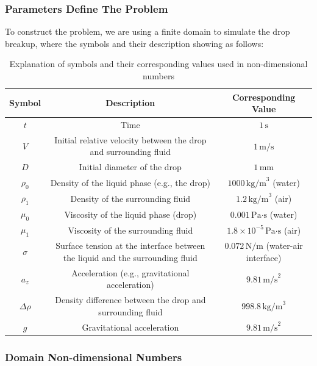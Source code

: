 \documentclass[12pt]{article}
\begin{document}
\subsubsection{Parameters Define The Problem}
To construct the problem, we are using a finite domain to simulate the drop breakup, where the symbols and their description showing as follows:
\begin{table}[H]
\scriptsize
\centering
\caption{Explanation of symbols and their corresponding values used in non-dimensional numbers}
\renewcommand{\arraystretch}{1.5} %
\begin{tabular}{|c|c|c|}
\hline
\textbf{Symbol} & \textbf{Description} & \textbf{Corresponding Value} \\ \hline
$t$     & Time & $1 \, \text{s}$ \\ \hline
$V$     & Initial relative velocity between the drop and surrounding fluid & $1 \, \text{m/s}$ \\ \hline
$D$     & Initial diameter of the drop & $1 \, \text{mm}$ \\ \hline
$\rho_0$ & Density of the liquid phase (e.g., the drop) & $1000 \, \text{kg/m}^3$ (water) \\ \hline
$\rho_1$ & Density of the surrounding fluid & $1.2 \, \text{kg/m}^3$ (air) \\ \hline
$\mu_0$  & Viscosity of the liquid phase (drop) & $0.001 \, \text{Pa·s}$ (water) \\ \hline
$\mu_1$  & Viscosity of the surrounding fluid & $1.8 \times 10^{-5} \, \text{Pa·s}$ (air) \\ \hline
$\sigma$ & Surface tension at the interface between the liquid and the surrounding fluid & $0.072 \, \text{N/m}$ (water-air interface) \\ \hline
$a_z$ & Acceleration (e.g., gravitational acceleration) & $9.81 \, \text{m/s}^2$ \\ \hline
$\Delta \rho$ & Density difference between the drop and surrounding fluid & $998.8 \, \text{kg/m}^3$ \\ \hline
$g$ & Gravitational acceleration & $9.81 \, \text{m/s}^2$ \\ \hline
\end{tabular}
\label{tab:SymbolExplanations}
\end{table}

\subsubsection{Domain Non-dimensional Numbers}
\end{document}
